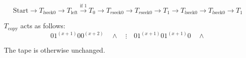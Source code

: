 $$\text{Start} \rightarrow T_{l\text{seek}0} \rightarrow T_{\text{left}} \xrightarrow{\text{if 1}} T_0 \rightarrow T_{r\text{seek}0} \rightarrow T_{r\text{seek}0} \rightarrow T_1 \rightarrow T_{l\text{seek}0} \rightarrow T_{l\text{seek}0} \rightarrow T_1$$

$T_{\text{copy}}$ acts as follows:
\[
0 1^{(x+1)} 0 0^{(x+2)} \quad \land \quad \vdots \quad 0 1^{(x+1)} 0 1^{(x+1)} 0 \quad \land
\]

The tape is otherwise unchanged.
